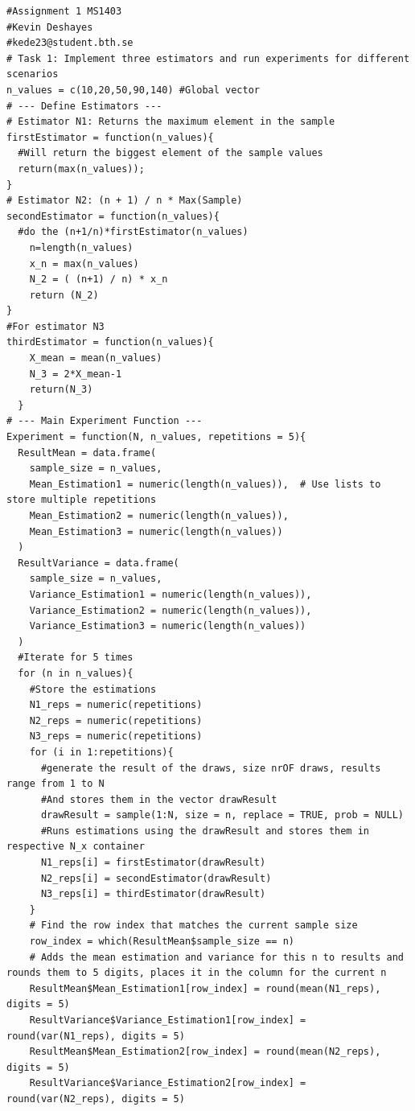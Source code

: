 \documentclass{report}
\begin{document}
\begin{verbatim}
#Assignment 1 MS1403
#Kevin Deshayes 
#kede23@student.bth.se
# Task 1: Implement three estimators and run experiments for different scenarios
n_values = c(10,20,50,90,140) #Global vector
# --- Define Estimators ---
# Estimator N1: Returns the maximum element in the sample
firstEstimator = function(n_values){
  #Will return the biggest element of the sample values
  return(max(n_values)); 
}
# Estimator N2: (n + 1) / n * Max(Sample)
secondEstimator = function(n_values){
  #do the (n+1/n)*firstEstimator(n_values) 
    n=length(n_values)
    x_n = max(n_values)
    N_2 = ( (n+1) / n) * x_n 
    return (N_2)
}
#For estimator N3
thirdEstimator = function(n_values){
    X_mean = mean(n_values)
    N_3 = 2*X_mean-1
    return(N_3) 
  }
# --- Main Experiment Function --- 
Experiment = function(N, n_values, repetitions = 5){
  ResultMean = data.frame(
    sample_size = n_values,
    Mean_Estimation1 = numeric(length(n_values)),  # Use lists to store multiple repetitions
    Mean_Estimation2 = numeric(length(n_values)),
    Mean_Estimation3 = numeric(length(n_values))
  )
  ResultVariance = data.frame(
    sample_size = n_values,
    Variance_Estimation1 = numeric(length(n_values)),
    Variance_Estimation2 = numeric(length(n_values)),
    Variance_Estimation3 = numeric(length(n_values))
  )
  #Iterate for 5 times
  for (n in n_values){
    #Store the estimations
    N1_reps = numeric(repetitions)
    N2_reps = numeric(repetitions)
    N3_reps = numeric(repetitions)
    for (i in 1:repetitions){
      #generate the result of the draws, size nrOF draws, results range from 1 to N
      #And stores them in the vector drawResult
      drawResult = sample(1:N, size = n, replace = TRUE, prob = NULL) 
      #Runs estimations using the drawResult and stores them in respective N_x container
      N1_reps[i] = firstEstimator(drawResult)
      N2_reps[i] = secondEstimator(drawResult)
      N3_reps[i] = thirdEstimator(drawResult)
    }
    # Find the row index that matches the current sample size
    row_index = which(ResultMean$sample_size == n)
    # Adds the mean estimation and variance for this n to results and rounds them to 5 digits, places it in the column for the current n
    ResultMean$Mean_Estimation1[row_index] = round(mean(N1_reps), digits = 5)
    ResultVariance$Variance_Estimation1[row_index] = round(var(N1_reps), digits = 5)
    ResultMean$Mean_Estimation2[row_index] = round(mean(N2_reps), digits = 5)
    ResultVariance$Variance_Estimation2[row_index] = round(var(N2_reps), digits = 5)

\end{verbatim}
\end{document}
